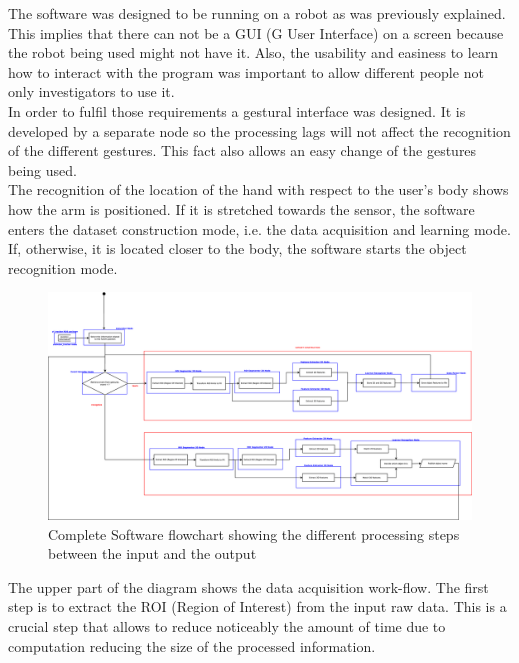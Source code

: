 The software was designed to be running on a robot as was previously explained. This implies that there can not be a GUI (G User Interface) on a screen because the robot being used might not have it. Also, the usability and easiness to learn how to interact with the program was important to allow different people not only investigators to use it. 
\\

In order to fulfil those requirements a gestural interface was designed. It is developed by a separate node so the processing lags will not affect the recognition of the different gestures. This fact also allows an easy change of the gestures being used. 
\\

The recognition of the location of the hand with respect to the user's body shows how the arm is positioned. If it is stretched towards the sensor, the software enters the dataset construction mode, i.e. the data acquisition and learning mode. If, otherwise, it is located closer to the body, the software starts the object recognition mode. 
\\

\begin{figure}[h]
	\begin{center}
\includegraphics[scale=0.1]{img/diagrams/flowcharts.eps}
	\caption[Software flowchart]{Complete Software flowchart showing the different processing steps between the input and the output}
	\end{center}
\end{figure}


The upper part of the diagram shows the data acquisition work-flow. The first step is to extract the ROI (Region of Interest) from the input raw data. This is a crucial step that allows to reduce noticeably the amount of time due to computation reducing the size of the processed information. 
\\


